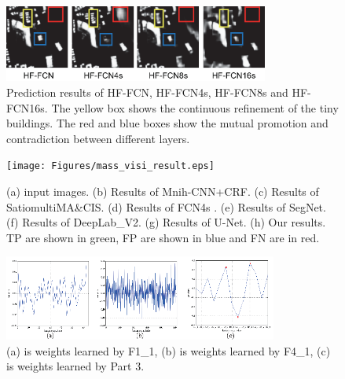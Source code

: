 \begin{figure}
\vspace{-0cm}
\setlength{\abovecaptionskip}{-0cm}  
\setlength{\belowcaptionskip}{-1cm}  
\centering
\includegraphics[width=8.7cm]{Figures/HF-FCN_variants_result.eps}
\caption{Prediction results of HF-FCN, HF-FCN4s, HF-FCN8s and HF-FCN16s. The yellow box shows the continuous refinement of the tiny buildings. The red and blue boxes show the mutual promotion and contradiction between different layers.}
\label{fig:Mass-variants-visi}
\end{figure}

\begin{figure}
\vspace{-0.5cm}
\setlength{\abovecaptionskip}{-0cm}
\setlength{\belowcaptionskip}{-1cm}  
\centering
\texttt{[image: Figures/mass\_visi\_result.eps]}
\caption{(a) input images. (b) Results of Mnih-CNN+CRF. (c) Results of Satio\-multi\-MA\&CIS. (d) Results of FCN4s . (e) Results of SegNet. (f) Results of DeepLab\_V2. (g) Results of U-Net. (h) Our results. TP are shown in green, FP are shown in blue and FN are in red.}
\label{fig:Mass-visi-result}
\end{figure}

\begin{figure}
\vspace{-0.4cm}
\setlength{\abovecaptionskip}{-0cm}
\setlength{\belowcaptionskip}{-1cm}  
\centering
\includegraphics[width=9cm]{Figures/weights.eps}
\caption{(a) is weights learned by F1\_1, (b) is weights learned by F4\_1, (c) is weights learned by Part 3.}
\label{fig:Mass-weights}
\end{figure}

